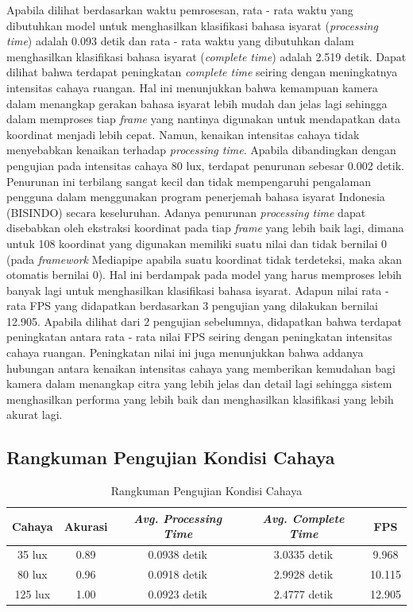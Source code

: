 Apabila dilihat berdasarkan waktu pemrosesan, rata - rata waktu yang dibutuhkan model untuk menghasilkan klasifikasi bahasa isyarat (\emph{processing time}) adalah 0.093 detik dan rata - rata waktu yang dibutuhkan dalam menghasilkan klasifikasi bahasa isyarat (\emph{complete time}) adalah 2.519 detik. Dapat dilihat bahwa terdapat peningkatan \emph{complete time} seiring dengan meningkatnya intensitas cahaya ruangan. Hal ini menunjukkan bahwa kemampuan kamera dalam menangkap gerakan bahasa isyarat lebih mudah dan jelas lagi sehingga dalam memproses tiap \emph{frame} yang nantinya digunakan untuk mendapatkan data koordinat menjadi lebih cepat. Namun, kenaikan intensitas cahaya tidak menyebabkan kenaikan terhadap \emph{processing time}. Apabila dibandingkan dengan pengujian pada intensitas cahaya 80 lux, terdapat penurunan sebesar 0.002 detik. Penurunan ini terbilang sangat kecil dan tidak mempengaruhi pengalaman pengguna dalam menggunakan program penerjemah bahasa isyarat Indonesia (BISINDO) secara keseluruhan. Adanya penurunan \emph{processing time} dapat disebabkan oleh ekstraksi koordinat pada tiap \emph{frame} yang lebih baik lagi, dimana untuk 108 koordinat yang digunakan memiliki suatu nilai dan tidak bernilai 0 (pada \emph{framework} Mediapipe apabila suatu koordinat tidak terdeteksi, maka akan otomatis bernilai 0). Hal ini berdampak pada model yang harus memproses lebih banyak lagi untuk menghasilkan klasifikasi bahasa isyarat. Adapun nilai rata - rata FPS yang didapatkan berdasarkan 3 pengujian yang dilakukan bernilai 12.905. Apabila dilihat dari 2 pengujian sebelumnya, didapatkan bahwa terdapat peningkatan antara rata - rata nilai FPS seiring dengan peningkatan intensitas cahaya ruangan. Peningkatan nilai ini juga menunjukkan bahwa addanya hubungan antara kenaikan intensitas cahaya yang memberikan kemudahan bagi kamera dalam menangkap citra yang lebih jelas dan detail lagi sehingga sistem menghasilkan performa yang lebih baik dan menghasilkan klasifikasi yang lebih akurat lagi.

\newpage
\subsection{Rangkuman Pengujian Kondisi Cahaya}
\label{sec:analisisrangkumancahaya}

\begin{longtable}{|c|c|c|c|c|}
  \caption{Rangkuman Pengujian Kondisi Cahaya}
  \label{tb:evaluasiCahaya}                                   \\
  \hline
  \rowcolor[HTML]{C0C0C0}
  \textbf{Cahaya} & \textbf{Akurasi} & \emph{\textbf{Avg. Processing Time}} & \emph{\textbf{Avg. Complete Time}} &\textbf{FPS} \\
  \hline
  35 lux & 0.89 & 0.0938 detik & 3.0335 detik  & 9.968\\
  80 lux & 0.96 & 0.0918 detik & 2.9928 detik  & 10.115\\
  125 lux & 1.00 & 0.0923 detik & 2.4777 detik & 12.905\\
  \hline
\end{longtable}

